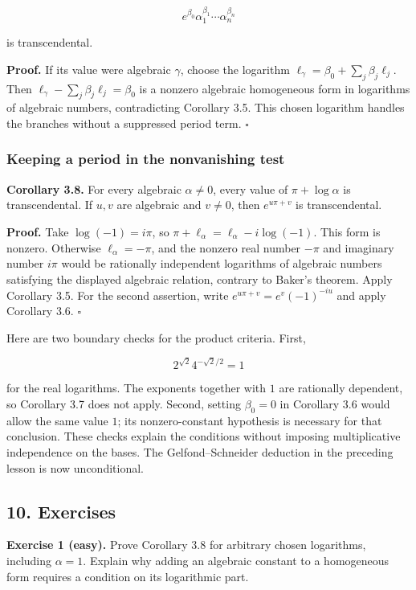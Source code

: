 \documentclass[
  11pt,
  a4paper,
]{article}
\begin{document}
\[
e^{\beta_0}\alpha_1^{\beta_1}\cdots\alpha_n^{\beta_n}
\]

is transcendental.

\textbf{Proof.} If its value were algebraic \(\gamma\), choose the
logarithm \(\ell_\gamma=\beta_0+\sum_j\beta_j\ell_j\). Then
\(\ell_\gamma-\sum_j\beta_j\ell_j=\beta_0\) is a nonzero algebraic
homogeneous form in logarithms of algebraic numbers, contradicting
Corollary 3.5. This chosen logarithm handles the branches without a
suppressed period term. \(\square\)

\subsubsection{Keeping a period in the nonvanishing
test}\label{keeping-a-period-in-the-nonvanishing-test}

\textbf{Corollary 3.8.} For every algebraic \(\alpha\ne0\), every value
of \(\pi+\log\alpha\) is transcendental. If \(u,v\) are algebraic and
\(v\ne0\), then \(e^{u\pi+v}\) is transcendental.

\textbf{Proof.} Take \(\log(-1)=i\pi\), so
\(\pi+\ell_\alpha=\ell_\alpha-i\log(-1)\). This form is nonzero.
Otherwise \(\ell_\alpha=-\pi\), and the nonzero real number \(-\pi\) and
imaginary number \(i\pi\) would be rationally independent logarithms of
algebraic numbers satisfying the displayed algebraic relation, contrary
to Baker's theorem. Apply Corollary 3.5. For the second assertion, write
\(e^{u\pi+v}=e^v(-1)^{-iu}\) and apply Corollary 3.6. \(\square\)

Here are two boundary checks for the product criteria. First,

\[
2^{\sqrt2}4^{-\sqrt2/2}=1
\]

for the real logarithms. The exponents together with \(1\) are
rationally dependent, so Corollary 3.7 does not apply. Second, setting
\(\beta_0=0\) in Corollary 3.6 would allow the same value \(1\); its
nonzero-constant hypothesis is necessary for that conclusion. These
checks explain the conditions without imposing multiplicative
independence on the bases. The Gelfond--Schneider deduction in the
preceding lesson is now unconditional.

\subsection{10. Exercises}\label{exercises}

\textbf{Exercise 1 (easy).} Prove Corollary 3.8 for arbitrary chosen
logarithms, including \(\alpha=1\). Explain why adding an algebraic
constant to a homogeneous form requires a condition on its logarithmic
part.
\end{document}
